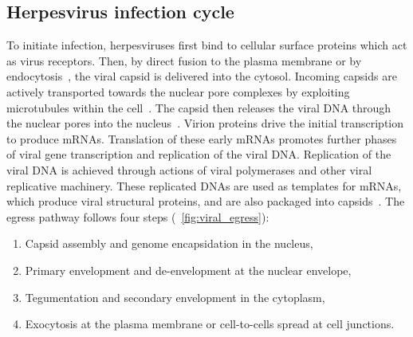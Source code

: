 \subsection{Herpesvirus infection cycle}
To initiate infection, herpesviruses first bind to cellular surface proteins which act as virus receptors. %
Then, by direct fusion to the plasma membrane or by endocytosis~\cite{heldweinEntryHerpesvirusesMammalian2008}, the viral \gls{capsid} is delivered into the cytosol.
Incoming capsids are actively transported towards the nuclear pore complexes by exploiting microtubules within the cell~\cite{radtkeMinusEndDirectedMicrotubule2010,sodeikMicrotubulemediatedTransportIncoming1997}.
The capsid then releases the viral DNA through the nuclear pores into the nucleus~\cite{ojalaHerpesSimplexVirus2000}.
Virion proteins drive the initial transcription to produce %
mRNAs.
Translation of these early mRNAs promotes further phases of viral gene transcription and replication of the viral DNA.\@
Replication of the viral DNA is achieved through actions of viral polymerases and other viral replicative machinery.
These replicated DNAs are used as templates for mRNAs, which produce viral structural proteins, and are also packaged into capsids~\cite{bainesHerpesSimplexVirus2011a}.
The egress pathway follows four steps (\figurename~\ref{fig:viral_egress}):

\begin{samepage}
  \begin{enumerate}
    \item Capsid assembly and genome encapsidation in the nucleus,
    \item Primary envelopment and de-envelopment at the nuclear envelope,
    \item Tegumentation and secondary envelopment in the cytoplasm,
    \item Exocytosis at the plasma membrane or cell-to-cells spread at cell junctions.
  \end{enumerate}
\end{samepage}

